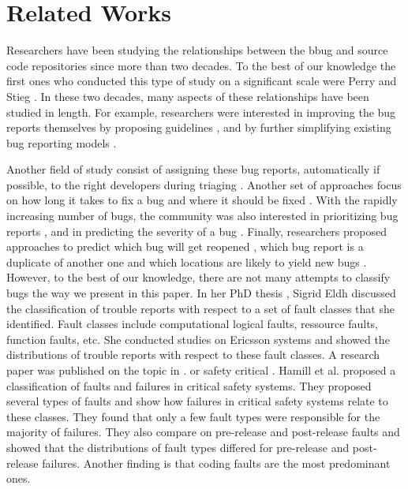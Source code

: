 \section{Related Works}

Researchers have been studying the relationships between
the bbug and source code repositories since more than two decades.
To the best of our knowledge the first ones who conducted this type of study on a significant scale were Perry and Stieg \cite{PerryDewayneE.1993}.
In these two decades, many aspects of these relationships have been studied in length.
For example, researchers were interested in improving the bug reports themselves by proposing guidelines \cite{Bettenburg2008}, and by further simplifying existing bug reporting models \cite{Herraiz2008}.

Another field of study consist of assigning these bug reports, automatically if possible, to the right developers during triaging \cite{Anvik2006,Jeong2009,Tamrawi2011a,Bortis2013}.
Another set of approaches focus on how long it takes to fix a bug
\cite{Zhang2013,Bhattacharya2011,Saha2014} and where it should be fixed \cite{Zhou2012,Zeller2013a}.
With the rapidly increasing number of bugs, the community was also interested in prioritizing bug reports \cite{Kim2011c}, and in predicting the severity of a bug \cite{Lamkanfi2010}.
Finally, researchers proposed approaches to predict which bug will get reopened \cite{Zimmermann2012,Lo2013}, which bug report is a duplicate of another one \cite{Bettenburg2008a,Tian2012a,Jalbert2008} and which locations are likely to yield new bugs \cite{Kim2007,Kim2006,Tufano2015}.
However, to the best of our knowledge, there are not many attempts to classify bugs the way we present in this paper.
In her PhD thesis \cite{Eldh2001}, Sigrid Eldh discussed the classification of trouble reports with respect to a set of fault classes that she identified.
Fault classes include computational logical faults, ressource faults, function faults, etc.
She conducted studies on Ericsson systems and showed the distributions of trouble reports with respect to these fault classes.
A research paper was published on the topic in \cite{Eldh2001}.
or safety critical \cite{Hamill2014}.
Hamill et al. \cite{Hamill2014} proposed a classification of faults and failures in critical safety systems.
They proposed several types of faults and show how failures in critical safety systems relate to these classes.
They found that only a few fault types were responsible for the majority of failures.
They also compare on pre-release and post-release faults and showed that the distributions of fault types differed for pre-release and post-release failures.
Another finding is that coding faults are the most predominant ones.

